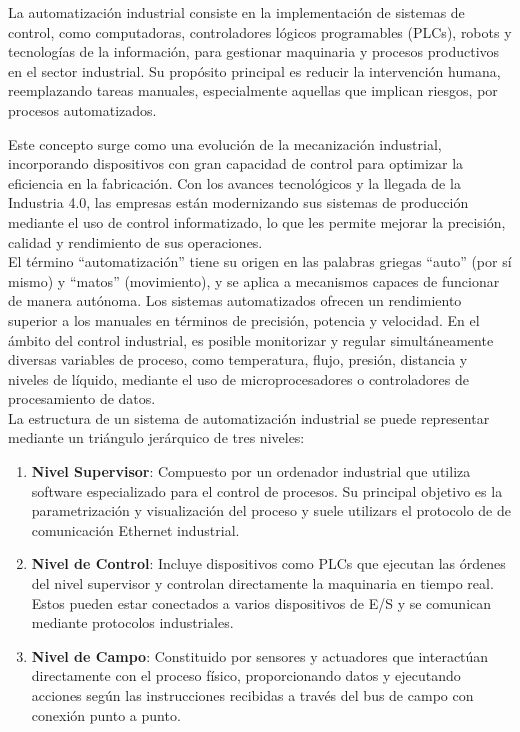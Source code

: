 La automatización industrial consiste en la implementación de sistemas de control, como computadoras, controladores lógicos programables (PLCs), robots y tecnologías de la información, para gestionar maquinaria y procesos productivos en el sector industrial. Su propósito principal es reducir la intervención humana, reemplazando tareas manuales, especialmente aquellas que implican riesgos, por procesos automatizados.

Este concepto surge como una evolución de la mecanización industrial, incorporando dispositivos con gran capacidad de control para optimizar la eficiencia en la fabricación. Con los avances tecnológicos y la llegada de la Industria 4.0, las empresas están modernizando sus sistemas de producción mediante el uso de control informatizado, lo que les permite mejorar la precisión, calidad y rendimiento de sus operaciones. \\

El término ``automatización'' tiene su origen en las palabras griegas ``auto'' (por sí mismo) y ``matos'' (movimiento), y se aplica a mecanismos capaces de funcionar de manera autónoma. Los sistemas automatizados ofrecen un rendimiento superior a los manuales en términos de precisión, potencia y velocidad. En el ámbito del control industrial, es posible monitorizar y regular simultáneamente diversas variables de proceso, como temperatura, flujo, presión, distancia y niveles de líquido, mediante el uso de microprocesadores o controladores de procesamiento de datos. \\

La estructura de un sistema de automatización industrial se puede representar mediante un triángulo jerárquico de tres niveles:

\begin{enumerate}
    \item \textbf{Nivel Supervisor}: Compuesto por un ordenador industrial que utiliza software especializado para el control de procesos. Su principal objetivo es la parametrización y visualización del proceso y suele utilizars el protocolo de de comunicación Ethernet industrial.
    \item \textbf{Nivel de Control}: Incluye dispositivos como PLCs que ejecutan las órdenes del nivel supervisor y controlan directamente la maquinaria en tiempo real. Estos pueden estar conectados a varios dispositivos de E/S y se comunican mediante protocolos industriales.
    \item \textbf{Nivel de Campo}: Constituido por sensores y actuadores que interactúan directamente con el proceso físico, proporcionando datos y ejecutando acciones según las instrucciones recibidas a través del bus de campo con conexión punto a punto. 
\end{enumerate}

